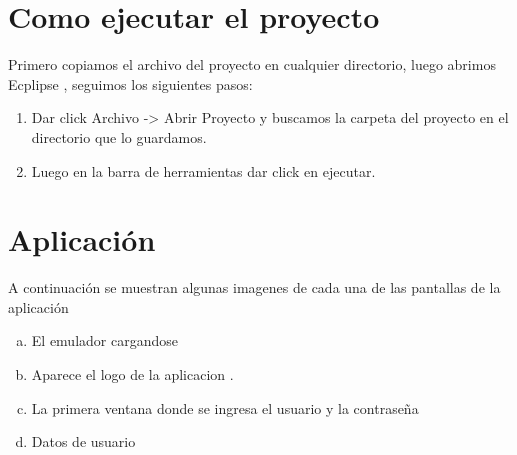 \documentclass[a4paper,11pt]{article}
\begin{document}
\section{ Como ejecutar el proyecto}
Primero copiamos el archivo del proyecto en cualquier directorio, luego abrimos Ecplipse , seguimos los siguientes pasos:
\begin{enumerate}
\item Dar click Archivo -> Abrir Proyecto y buscamos la carpeta del proyecto en el directorio que lo guardamos.
\item Luego en la barra de herramientas dar click en ejecutar.
\end{enumerate}
     
\begin{figure}[ht!]
 
   \centering
   \hspace{0.1\linewidth}
  
\end{figure}

 
\section{ Aplicación}
A continuación se muestran algunas imagenes de  cada una de las pantallas de la aplicación
\begin{enumerate}[a)]
     \item  El emulador cargandose
     \item Aparece el logo de la aplicacion .
     \item La primera ventana donde se ingresa el usuario y la contraseña
    \item Datos de usuario
    

\end{enumerate}
\end{document}

